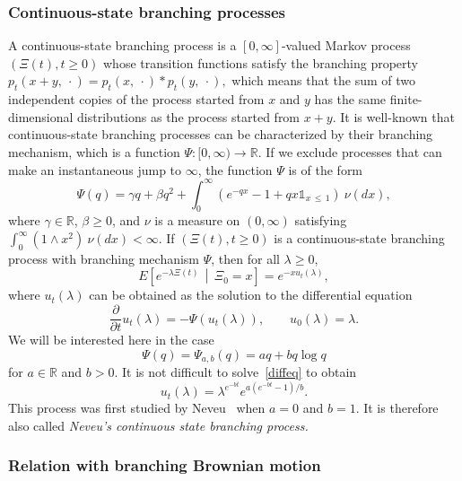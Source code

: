 \documentclass[AHL,Unicode,longabstracts,published]{cedram}
\newcommand*\R{\mathbb{R}}
\newcommand{\1} {\mathds{1}}
\begin{document}
\subsubsection{Continuous-state branching processes}
A continuous-state branching process is a $[0, \infty]$-valued Markov process $(\Xi(t), t \geq 0)$ whose transition functions satisfy the branching property $p_t(x + y, \: \cdot) = p_t(x, \: \cdot) * p_t(y, \: \cdot),$ which means that the sum of two independent copies of the process started from $x$ and $y$ has the same finite-dimensional distributions as the process started from $x + y$. It is well-known that continuous-state branching processes can be characterized by their branching mechanism, which is a function $\Psi: [0, \infty) \rightarrow \R$. If we exclude processes that can make an instantaneous jump to $\infty$, the function $\Psi$ is of the form
\[
\Psi(q) = \gamma q + \beta q^2 + \int_0^{\infty} \left(e^{-qx} - 1 + qx \1_{x\,\leq\,1}\right) \: \nu(dx),
\]
where $\gamma \in \R$, $\beta \geq 0$, and $\nu$ is a measure on $(0, \infty)$ satisfying $\int_0^{\infty} (1 \wedge x^2) \: \nu(dx) < \infty$. If $(\Xi(t), t \geq 0)$ is a continuous-state branching process with branching mechanism $\Psi$, then for all $\lambda \geq 0$,
\begin{equation}\label{csbpLaplace}
E\left[e^{-\lambda \Xi(t)} \,\middle| \, \Xi_0 = x\right] = e^{-x u_t(\lambda)},
\end{equation}
where $u_t(\lambda)$ can be obtained as the solution to the differential equation
\begin{equation}\label{diffeq}
\frac{\partial}{\partial t} u_t(\lambda) = -\Psi(u_t(\lambda)), \qquad u_0(\lambda) = \lambda.
\end{equation}
We will be interested here in the case
\begin{equation}\label{Psidef}
\Psi(q) = \Psi_{a,b}(q) = aq + bq \log q
\end{equation}
for $a \in \R$ and $b > 0$. It is not difficult to solve~\eqref{diffeq} to obtain
\begin{equation}\label{utlambda}
u_t(\lambda) = \lambda^{e^{-bt}} e^{a(e^{-bt} - 1)/b}.
\end{equation}
This process was first studied by Neveu~\cite{nev92} when $a = 0$ and $b = 1$. It is therefore also called \emph{Neveu's continuous state branching process.}

\subsubsection{Relation with branching Brownian motion}
\end{document}
